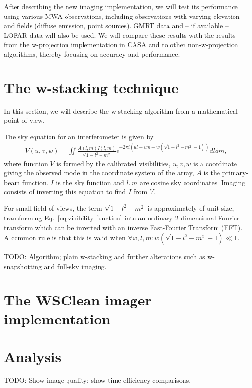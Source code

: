 \documentclass[useAMS,usenatbib]{mn2e}
\begin{document}
After describing the new imaging implementation, we will test its performance using various MWA observations, including observations with varying elevation and fields (diffuse emission, point sources). GMRT data and -- if available -- LOFAR data will also be used. We will compare these results with the results from the w-projection implementation in CASA and to other non-w-projection algorithms, thereby focusing on accuracy and performance.

\section{The w-stacking technique}
In this section, we will describe the w-stacking algorithm from a mathematical point of view.

The sky equation for an interferometer is given by
\begin{eqnarray}\label{eq:visibility-function}
V(u,v,w) = \iint \frac{A(l,m) I(l,m)}{\sqrt{1-l^2-m^2}} e^{-2\pi i \left(ul + vm + w(\sqrt{1-l^2-m^2}-1)\right)} dl dm,
\end{eqnarray}
where function $V$ is formed by the calibrated visibilities, $u,v,w$ is a coordinate giving the observed mode in the coordinate system of the array, $A$ is the primary-beam function, $I$ is the sky function and $l,m$ are cosine sky coordinates. Imaging consists of inverting this equation to find $I$ from $V$. 

For small field of views, the term $\sqrt{1-l^2-m^2}$ is approximately of unit size, transforming Eq.~\eqref{eq:visibility-function} into an ordinary 2-dimensional Fourier transform which can be inverted with an inverse Fast-Fourier Transform (FFT). A common rule is that this is valid when $\forall w,l,m: w\left(\sqrt{1-l^2-m^2}-1\right) \ll 1$.

TODO: Algorithm; plain w-stacking and further alterations such as w-snapshotting and full-sky imaging.
\section{The WSClean imager implementation}

\section{Analysis}
TODO: Show image quality; show time-efficiency comparisons.




\label{lastpage}
\end{document}

